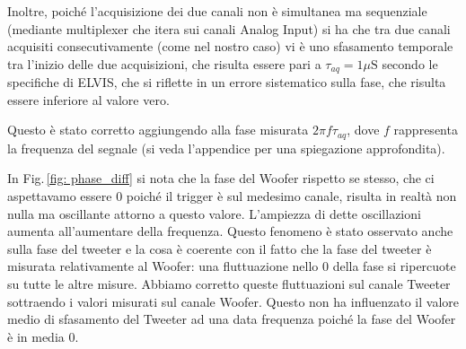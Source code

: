 \documentclass[../Relazione_circuiti]{subfiles}
\begin{document}
  Inoltre, poiché l'acquisizione dei due canali non è simultanea ma sequenziale (mediante multiplexer che itera sui
  canali Analog Input) si ha che tra due canali acquisiti consecutivamente (come nel nostro caso) vi è uno sfasamento
  temporale tra l'inizio delle due acquisizioni, che risulta essere pari a $\tau_{aq}=1 \mu \mathrm{S}$
  secondo le specifiche di ELVIS, che si riflette in un errore sistematico sulla fase, che risulta essere inferiore
  al valore vero.

  Questo è stato corretto aggiungendo alla fase misurata  $ 2 \pi f \tau_{aq}$, dove $f$
  rappresenta la frequenza del segnale (si veda l'appendice per una spiegazione approfondita).

  In Fig.\,\ref{fig: phase_diff}
  si nota che la fase del Woofer rispetto se stesso, che ci aspettavamo essere 0 poiché il trigger è sul medesimo
  canale, risulta in realtà non nulla ma oscillante attorno a questo valore.
  L'ampiezza di dette oscillazioni aumenta all'aumentare della frequenza.
  Questo fenomeno è stato osservato anche sulla fase del tweeter e la cosa è coerente con il fatto che la fase del
  tweeter è misurata relativamente al Woofer: una fluttuazione nello 0 della fase si ripercuote su tutte le altre
  misure.
  Abbiamo corretto queste fluttuazioni sul canale Tweeter sottraendo i valori misurati sul canale Woofer.
  Questo non ha influenzato il valore medio di sfasamento del Tweeter ad una data frequenza poiché la fase del Woofer
  è in media 0.
\end{document}
